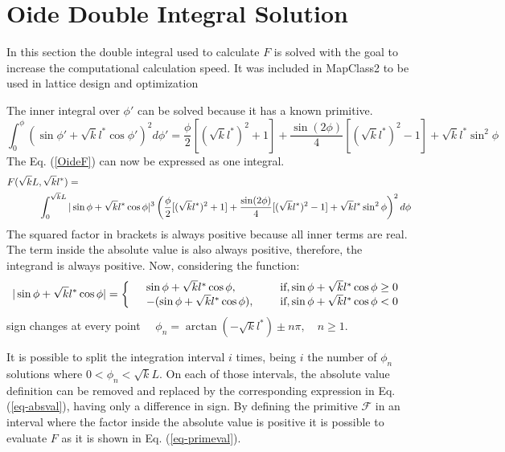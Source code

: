\section{Oide Double Integral Solution}\label{s:DoubleIntegral}
In this section the double integral used to calculate $F$ is solved with the goal to increase the computational calculation speed. It was included in MapClass2\cite{Mapclassorig,Mapclass,Mapclass2,githubMapClass2} to be used in lattice design and optimization\par
  The inner integral over $\phi'$ can be solved because it has a known primitive.
\begin{equation}
 \int_0^\phi (\sin \phi'+ \sqrt{k}l^*\cos\phi')^2d\phi'=\frac{\phi}{2}[(\sqrt{k}l^*)^2 +1 ] + \frac{\sin(2\phi)}{4}[(\sqrt{k}l^*)^2 -1]+\sqrt{k}l^*\sin^2\phi
\end{equation}
The Eq. (\ref{OideF}) can now be expressed as one integral.
{\scriptsize
\begin{align}
F(\sqrt{k}L&,\sqrt{k}l^*) =\\
&\int_0^{ \sqrt{k}L} |\sin\phi+\sqrt{k}l^*\cos\phi|^3 \left( \frac{\phi}{2}[(\sqrt{k}l^*)^2 +1 ] + \frac{\sin(2\phi)}{4}[(\sqrt{k}l^*)^2 -1]+\sqrt{k}l^*\sin^2\phi\right)^2 d\phi\notag
\end{align}
}
The squared factor in brackets is always positive because all inner terms are real. The term inside the absolute value is also always positive, therefore, the integrand is always positive. Now, considering the function:
  \begin{equation}
  |\sin \phi + \sqrt{k}l^*\cos\phi|=\left\{
  \begin{array}{c l l}
&  \sin\phi+\sqrt{k}l^*\cos	\phi,\quad\qquad&\text{if}, \sin\phi+	\sqrt{k}l^*\cos	\phi\geq0\\
&  -(\sin\phi+\sqrt{k}l^*\cos\phi),\quad&\text{if}, \sin\phi+	\sqrt{k}l^*\cos	\phi<0
  \end{array}\right.\label{eq-absval}
 \end{equation}
sign changes at every point $\quad\phi_n = \arctan(-\sqrt{ k}l^*)\pm n\pi,\quad n\geq1$.\par
It is possible to split the integration interval $i$ times, being $i$ the number of $\phi_n$ solutions where $0<\phi_n<\sqrt{k}L$. On each of those intervals, the absolute value definition can be removed and replaced by the corresponding expression in Eq. (\ref{eq-absval}), having only a difference in sign. By defining the primitive $\mathscr{F}$ in an interval where the factor inside the absolute value is positive it is possible to evaluate $F$ as it is shown in Eq. (\ref{eq-primeval}).
